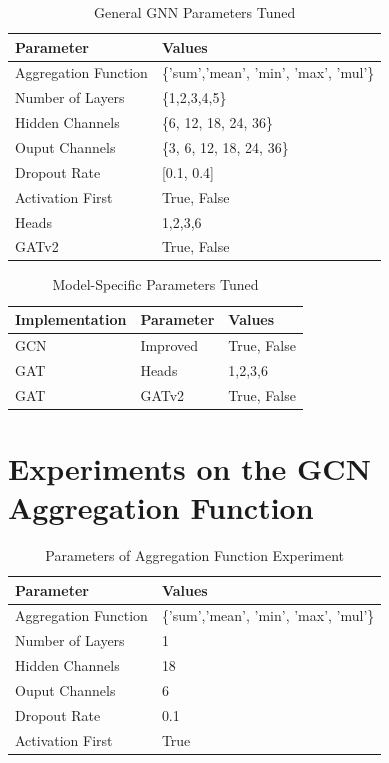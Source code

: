 \begin{table}
	\begin{tabular}{|l|l|}
		\hline
		\textbf{Parameter} & \textbf{Values} \\
		\hline
		Aggregation Function & \{'sum','mean', 'min', 'max', 'mul'\} \\
		\hline
		Number of Layers & \{1,2,3,4,5\} \\
		\hline
		Hidden Channels & \{6, 12, 18, 24, 36\} \\
		\hline
		Ouput Channels & \{3, 6, 12, 18, 24, 36\} \\
		\hline 
		Dropout Rate & [0.1, 0.4] \\
		\hline
		Activation First & {True, False} \\
		\hline 
		Heads & {1,2,3,6} \\
		\hline
		GATv2 & {True, False} \\
		\hline
	\end{tabular}
	\caption{General \ac{GNN} Parameters Tuned}
\end{table}

\begin{table}
	\begin{tabular}{|l|l|l|}
		\hline
		\textbf{Implementation} & \textbf{Parameter} & \textbf{Values} \\
		\hline
		GCN & Improved & {True, False} \\
		\hline 
		GAT & Heads & {1,2,3,6} \\
		\hline
		GAT & GATv2 & {True, False} \\
		\hline
	\end{tabular}
	\caption{Model-Specific Parameters Tuned}
\end{table}



\section{Experiments on the \ac{GCN} Aggregation Function} \label{appendix:aggr}

\begin{table}
	\begin{tabular}{|l|l|}
		\hline
		\textbf{Parameter} & \textbf{Values} \\
		\hline
		Aggregation Function & \{'sum','mean', 'min', 'max', 'mul'\} \\
		\hline
		Number of Layers & 1 \\
		\hline
		Hidden Channels & 18 \\
		\hline
		Ouput Channels & 6 \\
		\hline 
		Dropout Rate & 0.1 \\
		\hline
		Activation First & True \\
		\hline
	\end{tabular}
	\caption{Parameters of Aggregation Function Experiment}
	\label{table:aggr-params}
\end{table}

